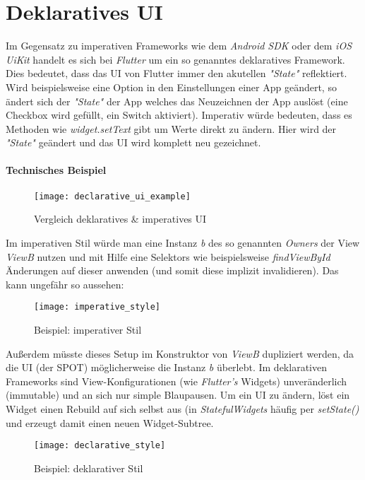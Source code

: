 \section{Deklaratives UI}
Im Gegensatz zu imperativen Frameworks wie dem \textit{Android SDK}
oder dem \textit{iOS UiKit} handelt es sich bei \textit{Flutter} um
ein so genanntes deklaratives Framework. Dies bedeutet,
dass das UI von Flutter immer den akutellen \textit{"State"} reflektiert.
Wird beispielsweise eine Option in den Einstellungen einer App geändert,
so ändert sich der \textit{"State"} der App welches das Neuzeichnen
der App auslöst (eine Checkbox wird gefüllt, ein Switch aktiviert).
Imperativ würde bedeuten, dass es Methoden wie \textit{widget.setText}
gibt um Werte direkt zu ändern. Hier wird der \textit{"State"} geändert
und das UI wird komplett neu gezeichnet.

\paragraph{Technisches Beispiel}\mbox{}
\hfill
\break

\begin{figure}[H]
    \centering
    \texttt{[image: declarative\_ui\_example]}
    \caption{Vergleich deklaratives \& imperatives UI}
\end{figure}
\newpage

Im imperativen Stil würde man eine Instanz \textit{b} des so
genannten \textit{Owners} der View \textit{ViewB} nutzen
und mit Hilfe eine Selektors wie beispielsweise \textit{findViewById}
Änderungen auf dieser anwenden (und somit diese implizit invalidieren).
Das kann ungefähr so aussehen:

\begin{figure}[H]
    \centering
    \texttt{[image: imperative\_style]}
    \caption{Beispiel: imperativer Stil}
\end{figure}

Außerdem müsste dieses Setup im Konstruktor von \textit{ViewB} dupliziert
werden, da die UI (der \ac{SPOT}) möglicherweise die Instanz \textit{b} überlebt.
Im deklarativen Frameworks sind View-Konfigurationen
(wie \textit{Flutter's} Widgets) unveränderlich (immutable) und an sich
nur simple Blaupausen. Um ein UI zu ändern, löst ein Widget einen Rebuild
auf sich selbst aus (in \textit{StatefulWidgets} häufig per \textit{setState()}
und erzeugt damit einen neuen Widget-Subtree.

\begin{figure}[H]
    \centering
    \texttt{[image: declarative\_style]}
    \caption{Beispiel: deklarativer Stil}
\end{figure}
